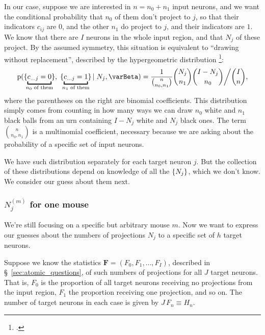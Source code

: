 \documentclass[\ifafour a4paper,12pt,\else a5paper,10pt,\fi%
onecolumn,oneside,article,%
british%
]{memoir}
\theoremstyle{remark}
\theoremstyle{innote}
\newcommand*{\citep}{\footcites}
\newcommand*{\pf}{\mathrm{p}}%
\renewcommand*{\|}[1][]{\nonscript\,#1\vert\nonscript\;\mathopen{}}
\newcommand*{\sect}{\S}%
\newcommand*{\chap}{ch.}%
\newcommand*{\yI}{\varBeta}
\newcommand*{\yF}{\bm{F}}
\newcommand*{\yNm}[1][m]{N^{(#1)}}
\DeclarePairedDelimiter\tu{\{}{\}}
\begin{document}
In our case, suppose we are interested in $n=n_{0}+n_{1}$ input neurons,
and we want the conditional probability that $n_{0}$ of them don't project
to $j$, so that their indicators $c_{ij}$ are $0$, and the other $n_{1}$
do project to $j$, and their indicators are $1$. We know that there are $I$
neurons in the whole input region, and that $N_{j}$ of these project. By
the assumed symmetry, this situation is equivalent to \enquote{drawing
  without replacement}, described by the hypergeometric distribution \citep[\chap~3]{jaynes1994_r2003}:
\begin{equation}
  \label{eq:hyperg_Nj}
  \pf(\tu{\underbracket{c_{\dotso j}=0}_{\mathclap{\text{$n_{0}$ of them}}}},
  \;\tu{\underbracket{c_{\dotso j}=1}_{\mathclap{\text{$n_{1}$ of them}}}} \| N_{j}, \yI)
  =
\frac{1}{\binom{n}{n_{0},n_{1}}}  \binom{N_{j}}{n_{1}}\binom{I-N_{j}}{n_{0}}\bigg/ \binom{I}{n},
\end{equation}
where the parentheses on the right are binomial coefficients. This
distribution simply comes from counting in how many ways we can draw
$n_{0}$ white and $n_{1}$ black balls from an urn containing $I-N_{j}$
white and $N_{j}$ black ones. The term $\binom{n}{n_{0},n_{1}}$ is a
multinomial coefficient, necessary because we are asking about the
probability of a specific set of input neurons.

We have such distribution separately for each target neuron $j$. But the
collection of these distributions depend on knowledge of all the
$\tu{N_{j}}$, which we don't know. We consider our guess about them next.



\subsubsection{$\yNm_{j}$ for one mouse}
\label{sec:onemouse_exch}

We're still focusing on a specific but arbitrary mouse $m$. Now we want to
express our guesses about the numbers of projections $N_{j}$ to a specific
set of $h$ target neurons.

Suppose we know the statistics $\yF=(F_{0}, F_{1}, \dotsc, F_{I})$,
described in \sect~\ref{sec:atomic_questions}, of such numbers of
projections for all $J$ target neurons. That is, $F_{0}$ is the proportion
of all target neurons receiving no projections from the input region,
$F_{1}$ the proportion receiving one projection, and so on. The number of
target neurons in each case is given by $J\,F_{n} \equiv H_{n}$.
\end{document}
